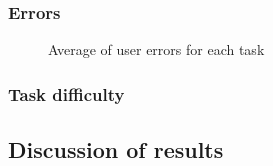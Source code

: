\subsubsection{Errors}
    \begin{figure}[!ht]
        \begin{minipage}{\linewidth}
            \centering
            \captionsetup{justification=centering}
            \caption{Average of user errors for each task}
            \label{BarsErrors}
        \end{minipage}
    \end{figure}

\subsubsection{Task difficulty}


\subsection{Discussion of results}
